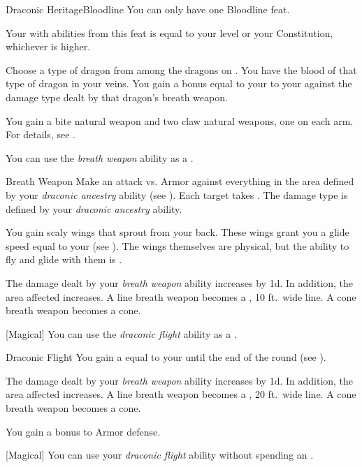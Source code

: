     \begin{feat}{Draconic Heritage}{Bloodline}
         You can only have one Bloodline feat.

         Your  with abilities from this feat is equal to your level or your Constitution, whichever is higher.

         Choose a type of dragon from among the dragons on .
        You have the blood of that type of dragon in your veins.
        You gain a bonus equal to your  to your  against the damage type dealt by that dragon's breath weapon.

         You gain a bite natural weapon and two claw natural weapons, one on each arm.
        For details, see .

         You can use the \textit{breath weapon} ability as a .
        \begin{apability}{Breath Weapon}
            Make an attack vs. Armor against everything in the area defined by your \textit{draconic ancestry} ability (see ).
            \hit Each target takes .
            The damage type is defined by your \textit{draconic ancestry} ability.
        \end{apability}

         You gain scaly wings that sprout from your back.
        These wings grant you a glide speed equal to your  (see ).
        The wings themselves are physical, but the ability to fly and glide with them is .

         The damage dealt by your \textit{breath weapon} ability increases by \plus1d.
        In addition, the area affected increases.
        A line breath weapon becomes a \areahuge, 10 ft.\ wide line.
        A cone breath weapon becomes a \arealarge cone.

        [Magical] You can use the \textit{draconic flight} ability as a .
        \begin{apability}{Draconic Flight}
            You gain a  equal to your  until the end of the round (see ).
        \end{apability}

         The damage dealt by your \textit{breath weapon} ability increases by \plus1d.
        In addition, the area affected increases.
        A line breath weapon becomes a \areahuge, 20 ft.\ wide line.
        A cone breath weapon becomes a \areahuge cone.

         You gain a  bonus to Armor defense.

        [Magical] You can use your \textit{draconic flight} ability without spending an .
    \end{feat}

